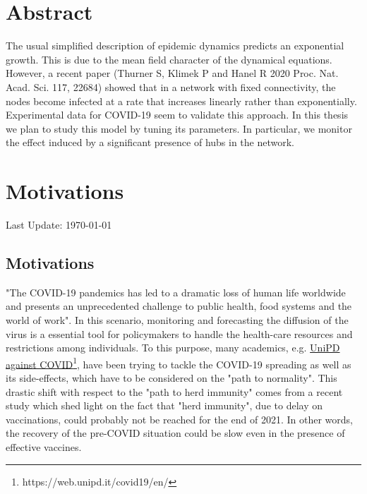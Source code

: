 \documentclass[a4paper,11pt,twoside]{book} %
\begin{document}

\newcommand{\changefont}{%
    \fontsize{7}{12}\selectfont
}
\fancyhf{}
\fancyhead[LE,RO]{\changefont \slshape \rightmark} %
\fancyhead[RE,LO]{\changefont \slshape \leftmark} %
\fancyfoot[C]{\thepage}
\pagestyle{fancy}



\chapter[Abstract]{Abstract}
The usual simplified description of epidemic dynamics predicts an exponential growth. This is due to the mean field character of the dynamical equations. However, a recent paper (Thurner S, Klimek P and Hanel R 2020 Proc. Nat. Acad. Sci. 117, 22684) \cite{Thurner::NetBasedExpl} showed
that in a network with fixed connectivity, the nodes become infected at a rate that increases linearly rather than exponentially.
Experimental data for COVID-19 seem to validate this approach. In this thesis we plan to study this model by tuning its parameters.
In particular, we monitor the effect induced by a significant presence of hubs in the network.

\chapter[Motivations]{Motivations}
Last Update: \today
\section{Motivations}
"The COVID-19 pandemics has led to a dramatic loss of human life worldwide and presents an unprecedented challenge to public health, food systems and the world of work"\cite{Chriscaden::2021_ImpactCOVID19}. In this scenario, monitoring and forecasting the diffusion of the virus is a essential tool for policymakers to handle the health-care resources and restrictions among individuals. To this purpose, many academics, e.g. \href{https://web.unipd.it/covid19/en/}{UniPD against COVID}\footnote{https://web.unipd.it/covid19/en/}, have been trying to tackle the COVID-19 spreading as well as its side-effects, which have to be considered on the "path to normality". This drastic shift with respect to the "path to herd immunity" comes from a recent study \cite{GU::2021_SitePathToNormality} which shed light on the fact that "herd immunity", due to delay on vaccinations, could probably not be reached for the end of 2021. In other words, the recovery of the pre-COVID situation could be slow even in the presence of effective vaccines.
\end{document}
